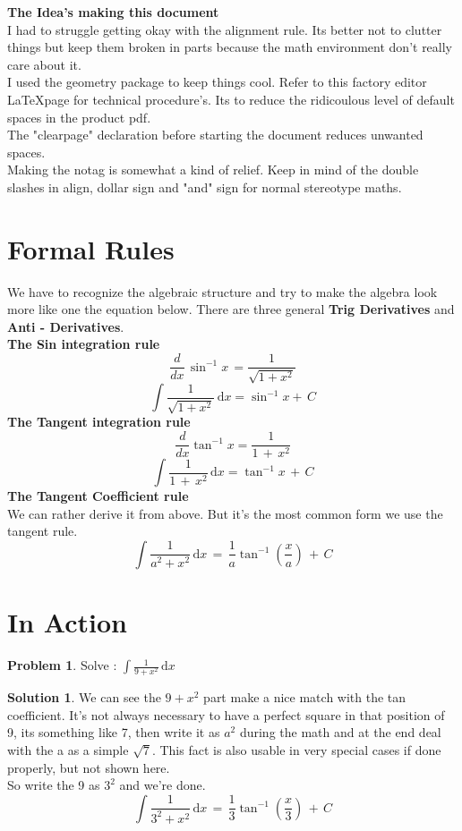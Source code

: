 \documentclass{article}
\theoremstyle{definition}
\newtheorem{prob}{\textsf{Problem}}[section]
\theoremstyle{definition}
\newtheorem{sol}{\textsf{Solution}}[section]
\theoremstyle{definition}
\begin{document}
\textsf{\textbf{The Idea's making this document}}\\
I had to struggle getting okay with the alignment rule. Its better not to clutter things but keep them broken in parts because the math environment don't really care about it. \\
I used the geometry package to keep things cool. Refer to this factory editor \LaTeX page for technical procedure's. Its to reduce the ridicoulous level of default spaces in the product pdf. \\
The "clearpage" declaration before starting the document reduces unwanted spaces.\\
Making the notag is somewhat a kind of relief. Keep in mind of the double slashes in align, dollar sign and "and" sign for normal stereotype maths.\\

\section{Formal Rules}
We have to recognize the algebraic structure and try to make the algebra look more like one the equation below. There are three general \textbf{Trig Derivatives} and \textbf{Anti - Derivatives}.\\
\textbf{\textsf{The Sin integration rule}}
\begin{equation}
\frac{d}{dx} \, \sin^{-1} x \, = \frac{1}{\sqrt{1 + x^2}}
\end{equation}
\[
\int  \frac{1}{\sqrt{1 + x^2}}\, \mathrm{d}x = \sin ^{-1}x + \, C
\] 
\textbf{\textsf{The Tangent integration rule}}
\begin{equation}
\frac{d}{dx} \tan ^{-1}x = \frac{1}{1 \, + \, x^2}
\end{equation} 
\[\int \frac{1}{1 \, + \, x^2} \, \mathrm{d}x = \tan ^{-1}x \, + \, C\]
\textbf{\textsf{The Tangent Coefficient rule}} \\
We can rather derive it from above. But it's the most common form we use the tangent rule.
\[\int \frac{1}{a^2 + x^2} \, \mathrm{d}x \,=\, \frac{1}{a} \tan ^{-1} (\frac{x}{a}) \,+\, C
\]
\section{In Action}

\begin{prob}
Solve : $ \int \frac{1}{9+x^2} \, \mathrm{d}x$
\end{prob}

\begin{sol}
We can see the $9 + x^2$ part make a nice match with the tan coefficient. It's not always necessary to have a perfect square in that position of 9, its something like 7, then write it as $a^2$ during the math and at the end deal with the a as a simple $\sqrt{7}$. This fact is also usable in very special cases if done properly, but not shown here.\\
So write the 9 as $3^2$ and we're done.
\[ \int \frac{1}{3^{2} + x^2} \, \mathrm{d} x \, = \, \frac{1}{3} \tan ^{-1}
 																									 (\frac{x}{3}) \, + \, C \]

\end{sol}
\end{document}
